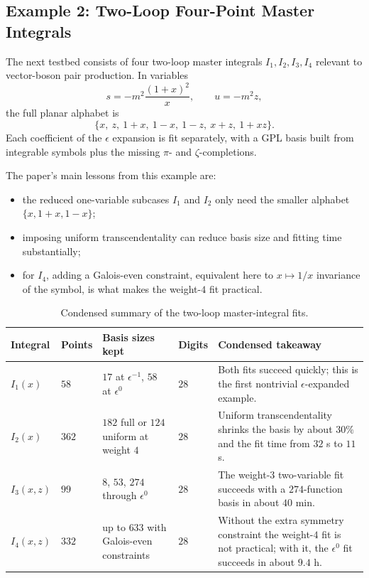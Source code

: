 \documentclass[11pt]{article}
\begin{document}
\subsection{Example 2: Two-Loop Four-Point Master Integrals}
The next testbed consists of four two-loop master integrals $I_1,I_2,I_3,I_4$ relevant to vector-boson pair production. In variables
\[
s=-m^2\frac{(1+x)^2}{x}, \qquad u=-m^2 z,
\]
the full planar alphabet is
\[
\{x,\ z,\ 1+x,\ 1-x,\ 1-z,\ x+z,\ 1+xz\}.
\]
Each coefficient of the $\epsilon$ expansion is fit separately, with a GPL basis built from integrable symbols plus the missing $\pi$- and $\zeta$-completions.

The paper's main lessons from this example are:
\begin{itemize}
    \item the reduced one-variable subcases $I_1$ and $I_2$ only need the smaller alphabet $\{x,1+x,1-x\}$;
    \item imposing uniform transcendentality can reduce basis size and fitting time substantially;
    \item for $I_4$, adding a Galois-even constraint, equivalent here to $x\mapsto 1/x$ invariance of the symbol, is what makes the weight-$4$ fit practical.
\end{itemize}

\begin{table}[ht]
\centering
\small
\begin{tabular}{>{\raggedright\arraybackslash}p{2.0cm} >{\centering\arraybackslash}p{1.3cm} >{\centering\arraybackslash}p{2.9cm} >{\centering\arraybackslash}p{1.3cm} >{\centering\arraybackslash}p{5.0cm}}
\toprule
Integral & Points & Basis sizes kept & Digits & Condensed takeaway \\
\midrule
$I_1(x)$ & $58$ & $17$ at $\epsilon^{-1}$, $58$ at $\epsilon^0$ & $28$ & Both fits succeed quickly; this is the first nontrivial $\epsilon$-expanded example. \\
$I_2(x)$ & $362$ & $182$ full or $124$ uniform at weight $4$ & $28$ & Uniform transcendentality shrinks the basis by about $30\%$ and the fit time from $32$ s to $11$ s. \\
$I_3(x,z)$ & $99$ & $8$, $53$, $274$ through $\epsilon^0$ & $28$ & The weight-$3$ two-variable fit succeeds with a $274$-function basis in about $40$ min. \\
$I_4(x,z)$ & $332$ & up to $633$ with Galois-even constraints & $28$ & Without the extra symmetry constraint the weight-$4$ fit is not practical; with it, the $\epsilon^0$ fit succeeds in about $9.4$ h. \\
\bottomrule
\end{tabular}
\caption{Condensed summary of the two-loop master-integral fits.}
\label{tab:two-loop-summary}
\end{table}
\end{document}
